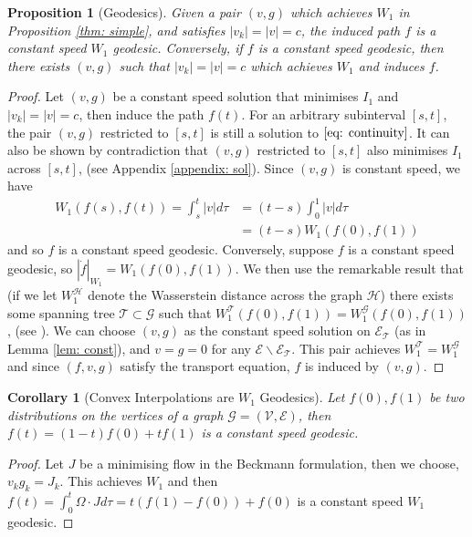 \documentclass[conference]{IEEEtran}
\newcommand{\GG}{\mathcal{G}}
\newcommand{\VV}{\mathcal{V}}
\newcommand{\EE}{\mathcal{E}}
\newcommand{\TT}{\mathcal{T}}
\theoremstyle{ieeestyle}
\newtheorem{prop}{Proposition}
\newtheorem{colry}{Corollary}
\begin{document}
\begin{prop}[Geodesics]\label{thm: geod}
Given a pair $(v,g)$ which achieves $W_1$ in Proposition \ref{thm: simple}, and satisfies $|v_k| = |v| = c$, the induced path $f$ is a constant speed $W_1$ geodesic. Conversely, if $f$ is a constant speed geodesic, then there exists $(v,g)$ such that  $|v_k| = |v| = c$ which achieves $W_1$ and induces $f$.
\end{prop}
\begin{proof}
    Let $(v,g)$ be a constant speed solution that minimises $I_1$ and $|v_k| = |v| = c$, then induce the path $f(t)$. For an arbitrary subinterval $[s,t]$, the pair $(v,g)$ restricted to $[s,t]$ is still a solution to $\eqref{eq: continuity}$. It can also be shown by contradiction that $(v,g)$ restricted to $[s,t]$ also minimises $I_1$ across $[s,t]$, (see Appendix \ref{appendix: sol}). Since $(v,g)$ is constant speed, we have
    \begin{align*}
        W_1(f(s),f(t)) = \int_s^t |v| d\tau
        &= (t-s)\int_0^1 |v| d\tau \\ &= (t-s)W_1(f(0),f(1))
    \end{align*}
    and so $f$ is a constant speed geodesic. Conversely, suppose $f$ is a constant speed geodesic, so $|\dot{f}|_{W_1} = W_1(f(0),f(1))$. We then use the remarkable result that (if we let $W^{\mathcal{H}}_1$ denote the Wasserstein distance across the graph $\mathcal{H}$) there exists some spanning tree $\TT \subset \GG$ such that $W^{\TT}_1(f(0),f(1)) = W^{\GG}_1(f(0),f(1))$, (see \cite{guy2019kantorovich}). We can choose $(v,g)$ as the constant speed solution on $\EE_{\TT}$ (as in Lemma \ref{lem: const}), and $v = g = 0$ for any $\EE \backslash \EE_{\TT}$. This pair achieves $W_1^{\TT} = W_1^{\GG}$ and since $(f,v,g)$ satisfy the transport equation, $f$ is induced by $(v,g)$.
\end{proof}
\begin{colry}[Convex Interpolations are $W_1$ Geodesics]\label{thm: conv}
    Let $f(0),f(1)$ be two distributions on the vertices of a graph $\GG = (\VV,\EE)$, then $f(t) = (1-t)f(0) + tf(1)$ is a constant speed geodesic.
\end{colry}
\begin{proof}
    Let $J$ be a minimising flow in the Beckmann formulation, then we choose, $v_kg_k = J_k$.  This achieves $W_1$ and then $f(t) = \int_0^t \Omega \cdot J d\tau = t(f(1) - f(0)) + f(0)$ is a constant speed $W_1$ geodesic.
\end{proof}
\end{document}
